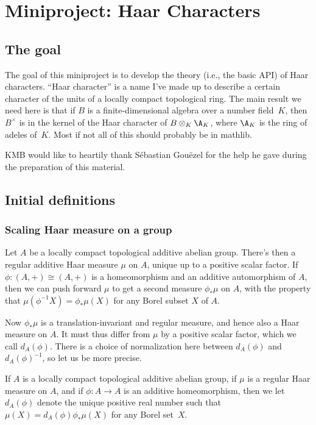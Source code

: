 \chapter{Miniproject: Haar Characters}\label{Haar_char_project}

\section{The goal}

The goal of this miniproject is to develop the theory (i.e., the basic API) of Haar characters.
``Haar character'' is a name I've made up to describe a certain character of the units of a locally
compact topological ring. The main result we need here is that if $B$ is a finite-dimensional
algebra over a number field~$K$, then $B^\times$ is in the kernel of the Haar character
of $B\otimes_K\A_K$, where $\A_K$ is the ring of adeles of~$K$. Most if not all of this
should probably be in mathlib.

KMB would like to heartily thank S\'ebastian Gou\"ezel for the help he gave during the preparation
of this material.

\section{Initial definitions}

\subsection{Scaling Haar measure on a group}

Let $A$ be a locally compact topological additive abelian group. There's then a regular additive
Haar measure $\mu$ on $A$, unique up to a positive scalar factor. If $\phi:(A,+)\cong(A,+)$ is a
homeomorphism and an additive automorphism of $A$, then we can push forward $\mu$
to get a second measure $\phi_*\mu$ on $A$, with the property that
$\mu(\phi^{-1}X)=\phi_*\mu(X)$ for any Borel subset $X$ of $A$.

Now $\phi_*\mu$ is a translation-invariant and regular measure,
and hence also a Haar measure on $A.$ It must thus differ from
$\mu$ by a positive scalar factor, which we call $d_A(\phi)$.
There is a choice of normalization here between $d_A(\phi)$
and $d_A(\phi)^{-1}$, so let us be more precise.

\begin{definition}
  \label{MeasureTheory.addEquivAddHaarChar}
  If $A$ is a locally compact topological additive abelian group,
  if $\mu$ is a regular Haar measure on $A$, and if $\phi:A\to A$ is an
  additive homeomorphism, then we let $d_A(\phi)$ denote the unique positive
  real number such that $\mu(X)=d_A(\phi)\phi_*\mu(X)$ for any Borel set~$X$.
\end{definition}


